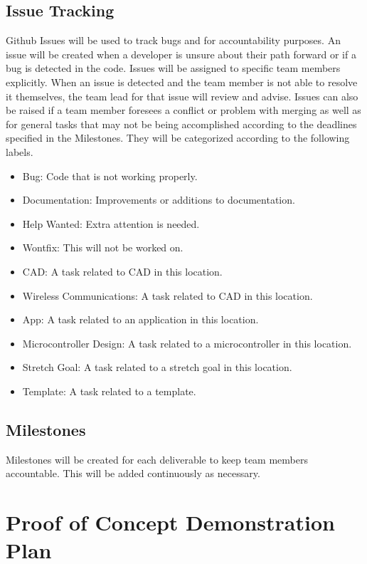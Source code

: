 \documentclass{article}
\begin{document}
\subsection{Issue Tracking}

Github Issues will be used to track bugs and for accountability purposes. An issue will be created when a developer is unsure about their path forward or if a bug is detected in the code. Issues will be assigned to specific team members explicitly. When an issue is detected and the team member is not able to resolve it themselves, the team lead for that issue will review and advise. Issues can also be raised if a team member foresees a conflict or problem with merging as well as for general tasks that may not be being accomplished according to the deadlines specified in the Milestones. 
\bigskip
They will be categorized according to the following labels.

\begin{itemize}

\item Bug: Code that is not working properly.
\item Documentation: Improvements or additions to documentation.
\item Help Wanted: Extra attention is needed.
\item Wontfix: This will not be worked on.
\item CAD: A task related to CAD in this location.
\item Wireless Communications: A task related to CAD in this location.
\item App: A task related to an application in this location.
\item Microcontroller Design: A task related to a microcontroller in this location.
\item Stretch Goal: A task related to a stretch goal in this location. 
\item Template: A task related to a template.
\end{itemize}

\subsection{Milestones}

Milestones will be created for each deliverable to keep team members accountable. This will be added continuously as necessary. 

\section{Proof of Concept Demonstration Plan}
\end{document}
